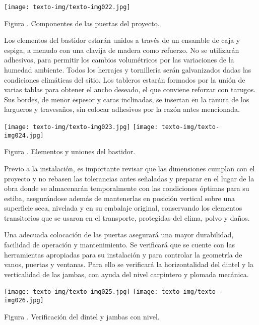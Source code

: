 \documentclass{article}
\newcounter{Figura}
\renewcommand\theFigura{\arabic{Figura}}
\begin{document}
\bigskip

 \texttt{[image: texto-img/texto-img022.jpg]} 

Figura \stepcounter{Figura}{\theFigura}. Componentes de las puertas del proyecto.


\bigskip

Los elementos del bastidor estarán unidos a través de un ensamble de caja y espiga, a menudo con una clavija de madera como refuerzo. No se utilizarán adhesivos, para permitir los cambios volumétricos por las variaciones de la humedad ambiente. Todos los herrajes y tornillería serán galvanizados dadas las condiciones climáticas del sitio. Los tableros estarán formados por la unión de varias tablas para obtener el ancho deseado, el que conviene reforzar con tarugos. Sus bordes, de menor espesor y caras inclinadas, se insertan en la ranura de los largueros y travesaños, sin colocar adhesivos por la razón antes mencionada.

 \texttt{[image: texto-img/texto-img023.jpg]}  \texttt{[image: texto-img/texto-img024.jpg]} 


\bigskip

Figura \stepcounter{Figura}{\theFigura}. Elementos y uniones del bastidor.


\bigskip

Previo a la instalación, es importante revisar que las dimensiones cumplan con el proyecto y no rebasen las tolerancias antes señaladas y preparar en el lugar de la obra donde se almacenarán temporalmente con las condiciones óptimas para su estiba, asegurándose además de mantenerlas en posición vertical sobre una superficie seca, nivelada y en su embalaje original, conservando los elementos transitorios que se usaron en el transporte, protegidas del clima, polvo y daños. 


\bigskip

Una adecuada colocación de las puertas asegurará una mayor durabilidad, facilidad de operación y mantenimiento. Se verificará que se cuente con las herramientas apropiadas para su instalación y para controlar la geometría de vanos, puertas y ventanas. Para ello se verificará la horizontalidad del dintel y la verticalidad de las jambas, con ayuda del nivel carpintero y plomada mecánica.

 \texttt{[image: texto-img/texto-img025.jpg]}   \texttt{[image: texto-img/texto-img026.jpg]} 

Figura \stepcounter{Figura}{\theFigura}. Verificación del dintel y jambas con nivel.


\bigskip
\end{document}
